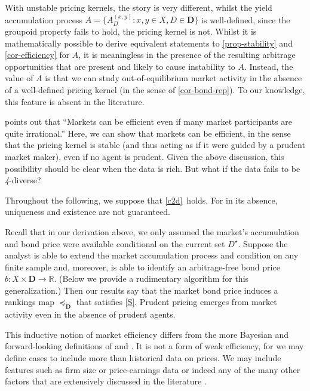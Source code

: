 \documentclass[ecta,nameyear,draft]{econsocart}
\newcommand{\R}{\mathbb R}
\newcommand{\mbbd}{{\mathbf D}}
\newcommand{\past}{{D^\star}}
\newcommand{\xy}{{(x, y)}}
\newcommand{\stability}{\ref{S}}
\theoremstyle{plain}
\theoremstyle{remark}
\begin{document}
With unstable pricing kernels, the story is very different, whilst the yield
accumulation process $A = \{A^{\xy}_D : x, y \in X, D \in \mbbd\}$ is
well-defined, since the groupoid property fails to hold, the pricing kernel is
not. Whilst it is mathematically possible to derive equivalent statements to
\cref{prop-stability} and \cref{cor-efficiency} for $A$, it is
meaningless in the presence of the resulting arbitrage opportunities that are
present and likely to cause instability to $A$.  Instead, the value of $A$ is
that we can study out-of-equilibrium market activity in the absence of a
well-defined pricing kernel (in the sense of \cref{cor-bond-rep}). To our
knowledge, this feature is absent in the literature.

 points out that ``Markets can be efficient
even if many market participants are quite irrational.'' Here, we can show that
markets can be efficient, in the sense that the pricing kernel is stable (and
thus acting as if it were guided by a prudent market maker), even if no agent
is prudent. Given the above discussion, this possibility should be clear when
the data is rich.  But what if the data fails to be \emph{4}-diverse?

Throughout the following, we suppose that \ref{c2d}\ holds. For in its
absence, uniqueness and existence are not guaranteed.

Recall that in our derivation above, we only assumed the market's accumulation
and bond price were available conditional on the current set $\past$. Suppose
the analyst is able to extend the market accumulation process and condition on
any finite sample and, moreover, is able to identify an arbitrage-free bond
price $b: X \times \mbbd \rightarrow \R$. (Below we provide a rudimentary
algorithm for this generalization.) Then our results say that the market bond
price induces a rankings map $\preceq_{\mbbd}$ that satisfies \stability.
Prudent pricing emerges from market activity even in the absence of prudent
agents.

This inductive notion of market efficiency differs from the more Bayesian and
forward-looking definitions of \citet{fama1970efficient} and
\citet{malkiel2003efficient}. It is not a form of weak efficiency, for we may
define cases to include more than historical data on prices. We may include
features such as firm size or price-earnings data or indeed any of the many
other factors that are extensively discussed in the literature
\citep{fama2015five,harvey2021lucky,gu2020empirical}.
\end{document}
